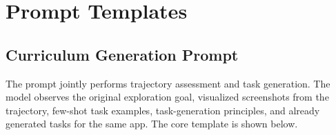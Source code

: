 \section{Prompt Templates}
\label{sec:appendix_prompts}

\subsection{Curriculum Generation Prompt}
\label{sec:curriculum_prompt}

The \curriculum prompt jointly performs trajectory assessment and task generation. The model observes the original exploration goal, visualized screenshots from the trajectory, few-shot task examples, task-generation principles, and already generated tasks for the same app. The core template is shown below.

